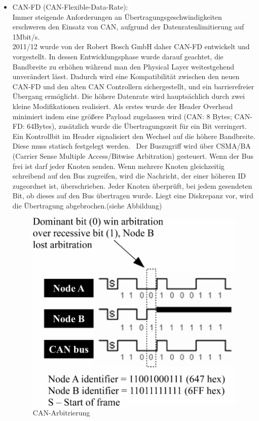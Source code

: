     \begin{itemize}
        \item{CAN-FD (CAN-Flexible-Data-Rate):}\\
        Immer steigende Anforderungen an Übertragungsgeschwindigkeiten erschweren den Einsatz von 
        CAN, aufgrund der Datenratenlimitierung auf 1Mbit/s.\\ 2011/12 wurde von der Robert Bosch GmbH 
        daher CAN-FD entwickelt und vorgestellt. In dessen
        Entwicklungsphase wurde darauf geachtet, die Bandbreite zu erhöhen während man den Physical 
        Layer weitestgehend unverändert lässt. Dadurch wird eine Kompatibilität zwischen den neuen 
        CAN-FD und den alten CAN Controllern sichergestellt, 
        und ein barrierefreier Übergang ermöglicht.
        Die höhere Datenrate wird hauptsächlich durch zwei kleine Modifikationen realisiert. 
        Als erstes wurde der Header Overhead minimiert indem eine größere Payload zugelassen 
        wird (CAN: 8 Bytes; CAN-FD: 64Bytes), zusätzlich wurde die Übertragungszeit für ein Bit 
        verringert.~\cite{LA_CAN_FD1}\\
        Ein Kontrollbit im Header signalisiert den Wechsel auf die höhere Bandbreite. Diese muss statisch 
        festgelegt werden.~\cite{LA_CAN_FD2}
        Der Buszugriff wird über CSMA/BA (Carrier Sense Multiple Access/Bitwise Arbitration) gesteuert.
        Wenn der Bus frei ist darf jeder Knoten senden. Wenn mehrere Knoten gleichzeitig schreibend auf 
        den Bus zugreifen, wird die Nachricht, der einer höheren ID zugeordnet ist, überschrieben. Jeder
        Knoten überprüft, bei jedem gesendeten Bit, ob dieses auf den Bus übertragen wurde. Liegt eine 
        Diskrepanz vor, wird die Übertragung abgebrochen.(siehe Abbildung)~\cite{LA_FR1}\cite{LA_CAN3}

        \begin{figure}
            \centering
            \includegraphics[width=0.5\linewidth]{./images/Kapitel4/CAN_Arbitration.png}
            \caption[
                An analysis of CAN-based steer-by-wire system performance in vehicle \cite{LA_CAN3}]{CAN-Arbitrierung}
        \end{figure}
    \end{itemize}
   
